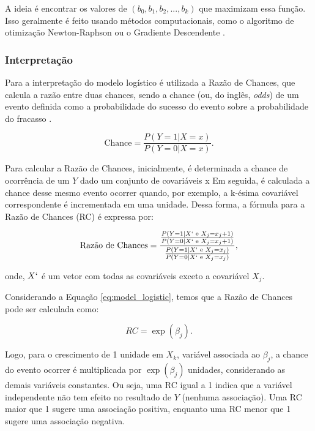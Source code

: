 A ideia é encontrar os valores de $(b_0, b_1, b_2, ..., b_k)$ que maximizam essa função. Isso geralmente é feito usando métodos computacionais, 
como o algoritmo de otimização Newton-Raphson ou o Gradiente Descendente \cite{curry1944}.

\subsubsection{Interpretação}


Para a interpretação do modelo logístico é utilizada a Razão de Chances, que calcula a razão entre duas chances, sendo a chance 
(ou, do inglês, \textit{odds})
de um evento definida como a probabilidade do sucesso do evento sobre a probabilidade do fracasso \cite{szumilas2010explaining}.

\begin{equation}
  \text{Chance} =  \frac{P(Y=1|X=x)}{P(Y=0|X=x)}.
\end{equation}

Para calcular a Razão de Chances, inicialmente, é determinada a chance de ocorrência de um
$Y$ dado um conjunto de covariáveis x
Em seguida, é calculada a chance desse mesmo evento ocorrer quando, por exemplo,
a k-ésima covariável 
correspondente é incrementada em uma unidade. 
Dessa forma, a fórmula para a Razão de Chances (RC) é expressa por:

\begin{equation}
  \text{Razão de Chances} =  \frac{\frac{P(Y=1 | X` \text{ e } X_j = x_j + 1)}{P(Y=0 | X` \text{ e } X_j = x_j + 1)}}{\frac{P(Y=1 | X` \text{ e } X_j = x_j)}{P(Y=0 | X` \text{ e } X_j = x_j)}}, 
\end{equation}

\noindent onde, $X`$ é um vetor com todas as covariáveis exceto a covariável $X_j$.

Considerando a Equação \ref{eq:model_logistic}, temos que a Razão de Chances pode ser calculada como:

\begin{equation}
  RC = \exp{(\beta_j)}.
\end{equation}

Logo, para o crescimento de 1 unidade em $X_k$, variável associada ao $\beta_j$, a chance do evento ocorrer 
é multiplicada por $\exp{(\beta_j)}$ unidades, considerando as demais variáveis constantes. 
Ou seja, uma RC igual a 1 indica que a variável independente não tem efeito no resultado de $Y$ (nenhuma associação).
Uma RC maior que 1 sugere uma associação positiva, enquanto uma RC menor que 1 sugere uma associação negativa.

